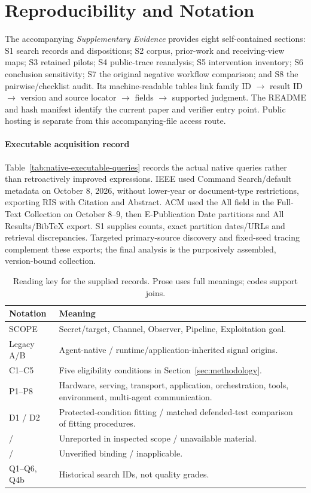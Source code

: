 \section{Reproducibility and Notation}\label{app:search}\label{app:notation}
The accompanying \emph{Supplementary Evidence} provides eight self-contained sections: S1 search records and dispositions; S2 corpus, prior-work and receiving-view maps; S3 retained pilots; S4 public-trace reanalysis; S5 intervention inventory; S6 conclusion sensitivity; S7 the original negative workflow comparison; and S8 the pairwise/checklist audit. Its machine-readable tables link family ID $\to$ result ID $\to$ version and source locator $\to$ fields $\to$ supported judgment. The README and hash manifest identify the current paper and verifier entry point. Public hosting is separate from this accompanying-file access route.

\paragraph{Executable acquisition record}
Table~\ref{tab:native-executable-queries} records the actual native queries rather than retroactively improved expressions. IEEE used Command Search/default metadata on October 8, 2026, without lower-year or document-type restrictions, exporting RIS with Citation and Abstract. ACM used the All field in the Full-Text Collection on October 8--9, then E-Publication Date partitions and All Results/BibTeX export. S1 supplies counts, exact partition dates/URLs and retrieval discrepancies. Targeted primary-source discovery and fixed-seed tracing complement these exports; the final analysis is the purposively assembled, version-bound collection.


\begin{table}[!ht]\centering\footnotesize
\caption{Reading key for the supplied records. Prose uses full meanings; codes support joins.}\label{tab:notation}
\begin{tabularx}{\columnwidth}{@{}p{}Y@{}}\toprule
Notation & Meaning\\\midrule
SCOPE & Secret/target, Channel, Observer, Pipeline, Exploitation goal.\\
Legacy A/B & Agent-native / runtime/application-inherited signal origins.\\
C1--C5 & Five eligibility conditions in Section~\ref{sec:methodology}.\\
P1--P8 & Hardware, serving, transport, application, orchestration, tools, environment, multi-agent communication.\\
D1 / D2 & Protected-condition fitting / matched defended-test comparison of fitting procedures.\\
\NRR{} / \NRA{} & Unreported in inspected scope / unavailable material.\\
\NRV{} / \NA{} & Unverified binding / inapplicable.\\
Q1--Q6, Q4b & Historical search IDs, not quality grades.\\\bottomrule
\end{tabularx}\end{table}
